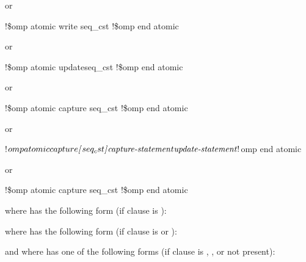 or

\begin{boxedcode}
!\$omp atomic write \plc{[}seq\_cst\plc{]}
\plc{[}!\$omp end atomic\plc{]}
\end{boxedcode}

or

\begin{boxedcode}
!\$omp atomic \plc{[}update\plc{] [}seq\_cst\plc{]}
\plc{[}!\$omp end atomic\plc{]}
\end{boxedcode}

or

\begin{boxedcode}
!\$omp atomic capture \plc{[}seq\_cst\plc{]}
!\$omp end atomic
\end{boxedcode}

or

\begin{boxedcode}
!$omp atomic capture {\textrm{\textmd{\itshape{[}}}}seq_cst{\textrm{\textmd{\itshape{]}}}}
    {\textrm{\textmd{\itshape{capture-statement}}}}
    {\textrm{\textmd{\itshape{update-statement}}}}
!$omp end atomic
\end{boxedcode}

or

\begin{boxedcode}
!\$omp atomic capture \plc{[}seq\_cst\plc{]}
!\$omp end atomic
\end{boxedcode}

where  has the following form (if clause is ):

\begin{quote}
\end{quote}

where  has the following form (if clause is  or ):

\begin{quote}
\end{quote}

\begin{figure}[t!]
\end{figure}
and where  has one of the following forms (if clause is , 
, or not present):

\begin{quote}



\end{quote}

